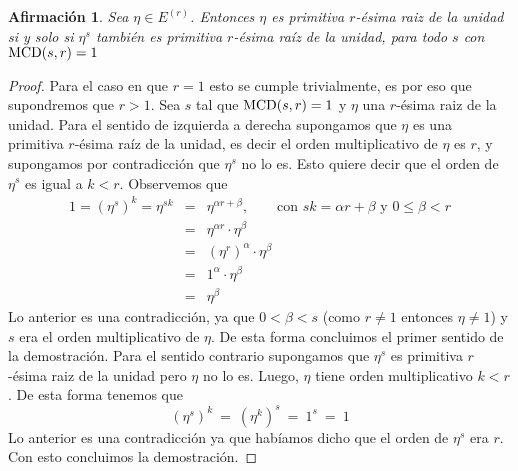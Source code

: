 \documentclass[10pt]{article}
\newcommand{\0}{\mathbf{0}}
\newcommand{\1}{\mathbf{1}}
\newcommand{\MCD}{{\rm MCD}}
\newcommand{\+}{\oplus}
\newcommand{\comentarioin}[1]{}
\newtheorem{afirmacion}[theorem]{Afirmación}
\theoremstyle{remark}
\theoremstyle{remark}
\begin{document}
\begin{afirmacion}\label{afirmacion relacion primitivas}
Sea $\eta\in E^{(r)}$. Entonces $\eta$ es primitiva $r$-ésima raiz de la unidad si y solo si $\eta^s$ también es primitiva $r$-ésima raí­z de la unidad, para todo $s$ con $\MCD(s,r)=1$\comentarioin{Tengo que argumentar que si parto de una raiz primitiva, entonces llego a todas las raices primitivas}
\comentarioin{Si tengo una raiz primitiva, entonces esa raiz  se va a ver como $\eta$ a la algo}
\end{afirmacion}
\begin{proof}
Para el caso en que $r=1$ esto se cumple trivialmente, es por eso que supondremos que $r>1$. Sea $s$ tal que  $\MCD(s,r) = 1$ y $\eta$ una $r$-ésima raiz de la unidad. Para el sentido de izquierda a derecha supongamos que $\eta$ es una primitiva $r$-ésima raí­z de la unidad, es decir el orden multiplicativo de $\eta$ es $r$, y supongamos por contradicción que $\eta^s$ no lo es. Esto quiere decir que el orden de $\eta^s$ es igual a $k<r$. Observemos que 
\begin{eqnarray*}
	1 =  (\eta^{s})^{k}=\eta^{sk} &=& \eta^{\alpha r + \beta},\quad\quad\text{con $sk = \alpha r + \beta$ y $0\leq \beta<r$}\\
	&=&  \eta^{\alpha r}\cdot \eta^{\beta}\\
	&=& (\eta^{r})^{\alpha}\cdot \eta^{\beta}\\
	&=& 1^{\alpha}\cdot \eta^{\beta}\\
	&=& \eta^{\beta}
\end{eqnarray*} 
Lo anterior es una contradicción, ya que $0<\beta<s$ (como $r\neq 1$ entonces $\eta\neq 1$) y $s$ era el orden multiplicativo de $\eta$. De esta forma concluimos el primer sentido de la demostración. Para el sentido contrario supongamos que $\eta^s$ es primitiva $r$-ésima raiz de la unidad pero $\eta$ no lo es. Luego, $\eta$ tiene orden multiplicativo $k< r$. De esta forma tenemos que $$(\eta^{s})^k \ = \ (\eta^{k})^s \ = \ 1^s \ = \ 1$$
Lo anterior es una contradicción ya que habíamos dicho que el orden de $\eta^{s}$ era $r$. Con esto concluimos la demostración.
\end{proof} 
\end{document}
